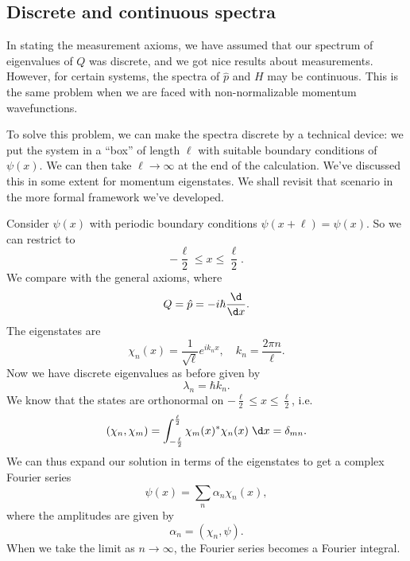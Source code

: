\documentclass[a4paper]{article}
\begin{document}
\subsection{Discrete and continuous spectra}
In stating the measurement axioms, we have assumed that our spectrum of eigenvalues of $Q$ was discrete, and we got nice results about measurements. However, for certain systems, the spectra of $\hat{p}$ and $H$ may be continuous. This is the same problem when we are faced with non-normalizable momentum wavefunctions.

To solve this problem, we can make the spectra discrete by a technical device: we put the system in a ``box'' of length $\ell$ with suitable boundary conditions of $\psi(x)$. We can then take $\ell \to \infty$ at the end of the calculation. We've discussed this in some extent for momentum eigenstates. We shall revisit that scenario in the more formal framework we've developed.

\begin{eg}
  Consider $\psi(x)$ with periodic boundary conditions $\psi(x + \ell) = \psi(x)$. So we can restrict to
  \[
    -\frac{\ell}{2} \leq x \leq \frac{\ell}{2}.
  \]
  We compare with the general axioms, where
  \[
    Q = \hat{p} = -i\hbar \frac{\d}{\d x}.
  \]
  The eigenstates are
  \[
    \chi_n(x) = \frac{1}{\sqrt{\ell}} e^{i k_n x},\quad k_n = \frac{2\pi n}{\ell}.
  \]
  Now we have discrete eigenvalues as before given by
  \[
    \lambda_n = \hbar k_n.
  \]
  We know that the states are orthonormal on $-\frac{\ell}{2} \leq x \leq \frac{\ell}{2}$, i.e.
  \[
    (\chi_n, \chi_m) = \int_{-\frac{\ell}{2}}^{\frac{\ell}{2}} \chi_m(x)^* \chi_n(x)\;\d x = \delta_{mn}.
  \]
  We can thus expand our solution in terms of the eigenstates to get a complex Fourier series
  \[
    \psi(x) = \sum_n \alpha_n \chi_n(x),
  \]
  where the amplitudes are given by
  \[
    \alpha_n = (\chi_n, \psi).
  \]
  When we take the limit as $n \to \infty$, the Fourier series becomes a Fourier integral.
\end{eg}
\end{document}
